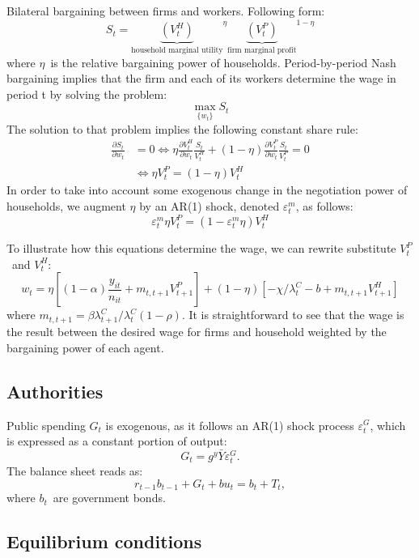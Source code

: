 \documentclass[a4paper,12pt]{article}%
\begin{document}
Bilateral bargaining between firms and workers. Following form:%
\[
S_{t}=\underset{\text{household marginal utility}}{\underbrace{\left(
V_{t}^{H}\right)  }}^{\eta}\underset{\text{firm marginal profit}}%
{\underbrace{\left(  V_{t}^{P}\right)  }}^{1-\eta}%
\]
where $\eta$\ is the relative bargaining power of households. Period-by-period
Nash bargaining implies that the firm and each of its workers determine the
wage in period t by solving the problem:%
\begin{equation}
\max_{\{w_{t}\}}S_{t}%
\end{equation}
The solution to that problem implies the following constant share rule:%
\begin{align*}
\frac{\partial S_{t}}{\partial w_{t}} &  =0\Leftrightarrow\eta\frac{\partial
V_{t}^{H}}{\partial w_{t}}\frac{S_{t}}{V_{t}^{H}}+\left(  1-\eta\right)
\frac{\partial V_{t}^{P}}{\partial w_{t}}\frac{S_{t}}{V_{t}^{P}}=0\\
&  \Leftrightarrow\eta V_{t}^{P}=\left(  1-\eta\right)  V_{t}^{H}%
\end{align*}
In order to take into account some exogenous change in the negotiation power
of households, we augment $\eta$ by an AR(1) shock, denoted $\varepsilon
_{t}^{m}$, as follows:%
\[
\varepsilon_{t}^{m}\eta V_{t}^{P}=\left(  1-\varepsilon_{t}^{m}\eta\right)
V_{t}^{H}%
\]


To illustrate how this equations determine the wage, we can rewrite substitute
$V_{t}^{P}$\ and $V_{t}^{H}$:%
\[
w_{t}=\eta\left[  (1-\alpha)\frac{y_{it}}{n_{it}}+m_{t,t+1}V_{t+1}^{P}\right]
+\left(  1-\eta\right)  \left[  -\chi/\lambda_{t}^{C}-b+m_{t,t+1}V_{t+1}%
^{H}\right]
\]
where $m_{t,t+1}=\beta\lambda_{t+1}^{C}/\lambda_{t}^{C}\left(  1-\rho\right)
$. It is straightforward to see that the wage is the result between the
desired wage for firms and household weighted by the bargaining power of each agent.

\subsection{Authorities}

Public spending $G_{t}$ is exogenous, as it follows an AR(1) shock process
$\varepsilon_{t}^{G}$, which is expressed as a constant portion of output:
\[
G_{t}=g^{y}\bar{Y}\varepsilon_{t}^{G}.
\]
The balance sheet reads as:%
\[
r_{t-1}b_{t-1}+G_{t}+bu_{t}=b_{t}+T_{t},
\]
where $b_{t}$\ are government bonds.

\subsection{Equilibrium conditions}
\end{document}

